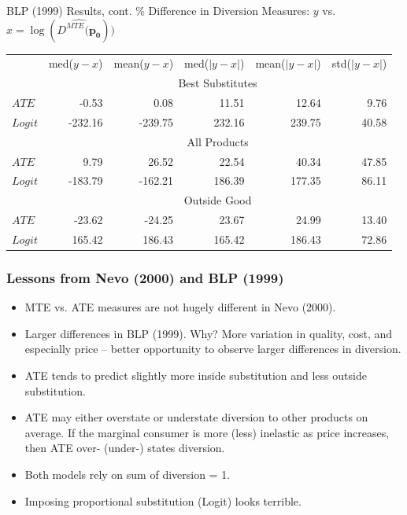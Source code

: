 \documentclass[xcolor=pdftex,dvipsnames,table,mathserif,aspectratio=169]{beamer}
\begin{document}
\begin{frame}[plain]{BLP (1999) Results, cont.}
\% Difference in Diversion Measures: $y$ vs. $x=\log(\widehat{D^{MTE}(\mathbf{p_0}}))$

\begin{center}
\footnotesize
\begin{tabular}{l  rrrrr}
\toprule
{} &  med($y-x$) &  mean($y-x$) &  med($|y-x|$) &  mean($|y-x|$) &  std($|y-x|$) \\
& \multicolumn{5}{c}{Best Substitutes}\\ \midrule
$ATE$   &       -0.53 &         0.08 &         11.51 &          12.64 &          9.76 \\
$Logit$ &     -232.16 &      -239.75 &        232.16 &         239.75 &         40.58 \\ \hline
& \multicolumn{5}{c}{All Products}\\ \hline
$ATE$   &        9.79 &        26.52 &         22.54 &          40.34 &         47.85 \\
$Logit$ &     -183.79 &      -162.21 &        186.39 &         177.35 &         86.11 \\ \hline
& \multicolumn{5}{c}{Outside Good}\\ \hline
$ATE$   &      -23.62 &       -24.25 &         23.67 &          24.99 &         13.40 \\
$Logit$ &      165.42 &       186.43 &        165.42 &         186.43 &         72.86 \\ 
\bottomrule
\end{tabular}
\end{center}
\end{frame}


\begin{frame}
\frametitle{Lessons from Nevo (2000) and BLP (1999)}
\begin{itemize}
\item MTE vs. ATE measures are not hugely different in Nevo (2000).
\item Larger differences in BLP (1999). Why? More variation in quality, cost, and especially price -- better opportunity to observe larger differences in diversion.
\item ATE tends to predict slightly more inside substitution and less outside substitution. 
\item ATE may either overstate or understate diversion to other products on average. If the marginal consumer is more (less) inelastic as price increases, then ATE over- (under-) states diversion.
\item Both models rely on sum of diversion = 1.
\item Imposing proportional substitution (Logit) looks terrible.
\end{itemize}
\end{frame}
\end{document}

